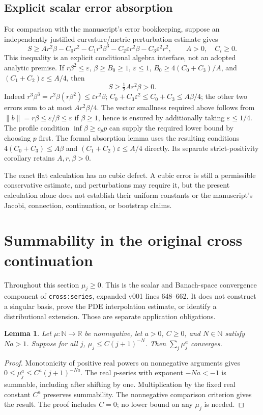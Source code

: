 \documentclass[11pt]{article}
\newtheorem{lemma}[theorem]{Lemma}
\theoremstyle{definition}
\theoremstyle{remark}
\numberwithin{equation}{section}
\begin{document}
\subsection{Explicit scalar error absorption}\label{geometry:errors}
For comparison with the manuscript's error bookkeeping, suppose an
independently justified curvature/metric perturbation estimate gives
\[
 S\ge A r^2\beta-C_0r^2-C_1r^3\beta^3
              -C_2\varepsilon r^2\beta-C_3\varepsilon^2r^2,
 \qquad A>0,\quad C_i\ge0.
\]
This inequality is an explicit conditional algebra interface, not an adopted
analytic premise. If $r\beta^2\le\varepsilon$, $\beta\ge B_0\ge1$,
$\varepsilon\le1$, $B_0\ge4(C_0+C_3)/A$, and
$(C_1+C_2)\varepsilon\le A/4$, then
\[
 S\ge\tfrac12 A r^2\beta>0.
\]
Indeed $r^3\beta^3=r^2\beta(r\beta^2)\le\varepsilon r^2\beta$;
$C_0+C_3\varepsilon^2\le C_0+C_3\le A\beta/4$; the other two
errors sum to at most $A r^2\beta/4$.  The vector smallness required
above follows from $\|b\|=r\beta\le\varepsilon/\beta\le\varepsilon$
if $\beta\ge1$, hence is ensured by additionally taking
$\varepsilon\le1/4$.  The profile condition $\inf\beta\ge c_p p$
can supply the required lower bound by choosing $p$ first.
The formal absorption lemma uses the resulting conditions
$4(C_0+C_3)\le A\beta$ and $(C_1+C_2)\varepsilon\le A/4$
directly. Its separate strict-positivity corollary retains $A,r,\beta>0$.

The exact flat calculation has no cubic defect. A cubic error is still a
permissible conservative estimate, and perturbations may require it, but the
present calculation alone does not establish their uniform constants or the
manuscript's Jacobi, connection, continuation, or bootstrap claims.

\clearpage

\section{Summability in the original cross continuation}
Throughout this section $\mu_j\ge0$. This is the scalar and Banach-space convergence component of
\texttt{cross:series}, expanded v001 lines 648--662. It does not construct
a singular basis, prove the PDE interpolation estimate, or identify a
distributional extension. Those are separate application obligations.

\begin{lemma}\label{cross-formal:power-decay}
Let $\mu:\mathbb N\to\mathbb R$ be nonnegative, let $a>0$, $C\ge0$,
and $N\in\mathbb N$ satisfy $Na>1$. Suppose for all $j$,
$\mu_j\le C(j+1)^{-N}$. Then $\sum_j\mu_j^a$ converges.
\end{lemma}
\begin{proof}
Monotonicity of positive real powers on nonnegative arguments gives
$0\le\mu_j^a\le C^a(j+1)^{-Na}$. The real $p$-series with exponent
$-Na<-1$ is summable, including after shifting by one. Multiplication by
the fixed real constant $C^a$ preserves summability. The nonnegative
comparison criterion gives the result. The proof includes $C=0$;
no lower bound on any $\mu_j$ is needed.
\end{proof}
\end{document}
